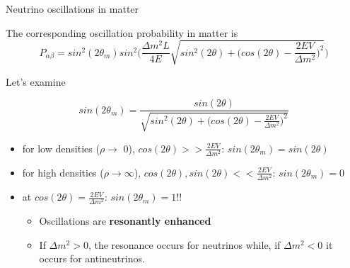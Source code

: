 \begin{frame}{Neutrino oscillations in matter}

The corresponding oscillation probability in matter is
  \begin{equation}
    \nonumber
    P_{\alpha \beta} = sin^2(2\theta_m) sin^2\Big(
       \frac{\Delta m^2 L}{4E}
       \sqrt{sin^2(2\theta) + \Big( cos(2\theta) - \frac{2EV}{\Delta m^2} \Big)^2}
    \Big)
  \end{equation}

  Let's examine

  \begin{equation}
    \nonumber
    sin(2\theta_m) =
      \frac{sin(2\theta)}{\sqrt{sin^2(2\theta) +
         \Big( cos(2\theta) - \frac{2EV}{\Delta m^2} \Big)^2}}
  \end{equation}

  \begin{itemize}
    \item for low densities ($\rho \rightarrow$ 0), $cos(2\theta) >> \frac{2EV}{\Delta m^2}$:
          {\color{magenta} $sin(2\theta_m) = sin(2\theta)$}
    \item for high densities ($\rho \rightarrow \infty$), $cos(2\theta),sin(2\theta) << \frac{2EV}{\Delta m^2}$:
          {\color{magenta} $sin(2\theta_m) = 0$}
    \item at $cos(2\theta) = \frac{2EV}{\Delta m^2}$:   {\color{magenta} $sin(2\theta_m) = 1$}!!
    \begin{itemize}
      \item Oscillations are {\bf resonantly enhanced}
      \item If $\Delta m^2 > 0$, the resonance occurs for neutrinos while, if
            $\Delta m^2 < 0$ it occurs for antineutrinos.
    \end{itemize}

  \end{itemize}

\end{frame}

%
%
%

